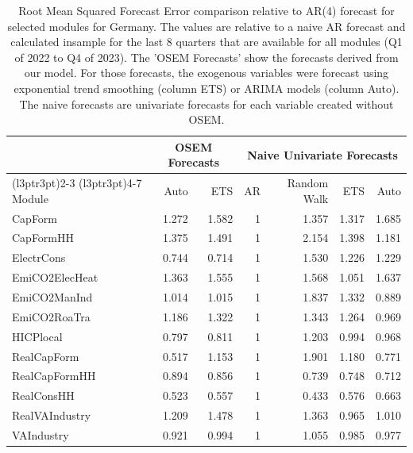 \begin{table}

\caption{\label{tab:rmsfe_DE}Root Mean Squared Forecast Error comparison relative to AR(4) forecast for selected modules for Germany. The values are relative to a naive AR forecast and calculated insample for the last 8 quarters that are available for all modules (Q1 of 2022 to Q4 of 2023). The 'OSEM Forecasts' show the forecasts derived from our model. For those forecasts, the exogenous variables were forecast using exponential trend smoothing (column ETS) or ARIMA models (column Auto). The naive forecasts are univariate forecasts for each variable created without OSEM.}
\centering
\begin{tabular}[t]{lrrrrrr}
\toprule
\multicolumn{1}{c}{ } & \multicolumn{2}{c}{OSEM Forecasts} & \multicolumn{4}{c}{Naive Univariate Forecasts} \\
\cmidrule(l{3pt}r{3pt}){2-3} \cmidrule(l{3pt}r{3pt}){4-7}
Module & Auto & ETS & AR & Random Walk & ETS & Auto\\
\midrule
CapForm & 1.272 & 1.582 & 1 & 1.357 & 1.317 & 1.685\\
CapFormHH & 1.375 & 1.491 & 1 & 2.154 & 1.398 & 1.181\\
ElectrCons & 0.744 & 0.714 & 1 & 1.530 & 1.226 & 1.229\\
EmiCO2ElecHeat & 1.363 & 1.555 & 1 & 1.568 & 1.051 & 1.637\\
EmiCO2ManInd & 1.014 & 1.015 & 1 & 1.837 & 1.332 & 0.889\\
\addlinespace
EmiCO2RoaTra & 1.186 & 1.322 & 1 & 1.343 & 1.264 & 0.969\\
HICPlocal & 0.797 & 0.811 & 1 & 1.203 & 0.994 & 0.968\\
RealCapForm & 0.517 & 1.153 & 1 & 1.901 & 1.180 & 0.771\\
RealCapFormHH & 0.894 & 0.856 & 1 & 0.739 & 0.748 & 0.712\\
RealConsHH & 0.523 & 0.557 & 1 & 0.433 & 0.576 & 0.663\\
\addlinespace
RealVAIndustry & 1.209 & 1.478 & 1 & 1.363 & 0.965 & 1.010\\
VAIndustry & 0.921 & 0.994 & 1 & 1.055 & 0.985 & 0.977\\
\bottomrule
\end{tabular}
\end{table}
